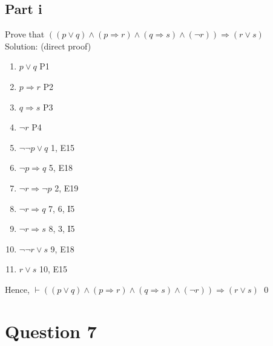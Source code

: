 \documentclass{article}
\begin{document}
		\subsection{Part i}
			Prove that $((p \lor q) \land (p \Rightarrow r) \land (q \Rightarrow s) \land (\lnot r)) \Rightarrow (r \lor s)$ \\
			Solution: (direct proof) \\
			\begin{enumerate}
				\item $p \lor q$ \hfill P1 
				\item $p \Rightarrow r$ \hfill P2 
				\item $q \Rightarrow s$ \hfill P3 
				\item $\lnot r$ \hfill P4 
				\item $\lnot\lnot p \lor q$ \hfill 1, E15
				\item $\lnot p \Rightarrow q$ \hfill 5, E18
				\item $\lnot r \Rightarrow \lnot p$ \hfill 2, E19 
				\item $\lnot r \Rightarrow q$ \hfill 7, 6, I5 
				\item $\lnot r \Rightarrow s$ \hfill 8, 3, I5
				\item $\lnot\lnot r \lor s$ \hfill  9, E18
				\item $r \lor s$ \hfill 10, E15 
			\end{enumerate}
			Hence, $\vdash$$((p \lor q) \land (p \Rightarrow r) \land (q \Rightarrow s) \land (\lnot r)) \Rightarrow (r \lor s)$ \hfill \qed
	\section{Question 7}
\end{document}
